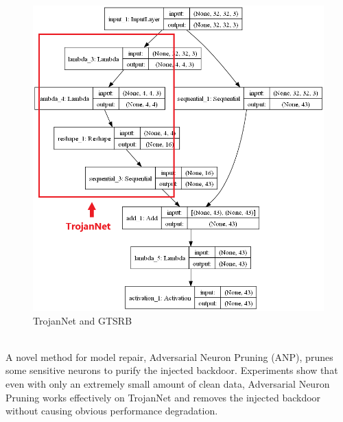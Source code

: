 \documentclass[english,version-2022-01]{uzl-thesis}
\begin{document}
\begin{figure}[htbp]
\begin{minipage}{0.49\linewidth}
		\includegraphics[width=0.9\linewidth]{pic/TrojanNet_GTSRB.png}
		\caption{TrojanNet and GTSRB}
            \label{TrojanNet and GTSRB}
	\end{minipage}
\end{figure}\\
A novel method for model repair, Adversarial Neuron Pruning (ANP), prunes some sensitive neurons to purify the injected backdoor. Experiments show that even with only an extremely small amount of clean data, Adversarial Neuron Pruning works effectively on TrojanNet and removes the injected backdoor without causing obvious performance degradation.\cite{wu2021adversarial} 
\end{document}
